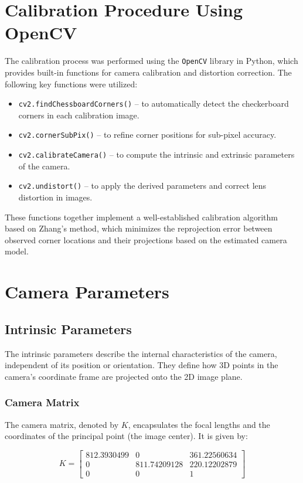 \section{Calibration Procedure Using OpenCV}
The calibration process was performed using the \texttt{OpenCV} library in Python, which provides built-in functions for camera calibration and distortion correction. The following key functions were utilized:
\begin{itemize}
    \item \texttt{cv2.findChessboardCorners()} – to automatically detect the checkerboard corners in each calibration image.
    \item \texttt{cv2.cornerSubPix()} – to refine corner positions for sub-pixel accuracy.
    \item \texttt{cv2.calibrateCamera()} – to compute the intrinsic and extrinsic parameters of the camera.
    \item \texttt{cv2.undistort()} – to apply the derived parameters and correct lens distortion in images.
\end{itemize}

These functions together implement a well-established calibration algorithm based on Zhang’s method, which minimizes the reprojection error between observed corner locations and their projections based on the estimated camera model.

\section{Camera Parameters}

\subsection{Intrinsic Parameters}
The intrinsic parameters describe the internal characteristics of the camera, independent of its position or orientation. They define how 3D points in the camera’s coordinate frame are projected onto the 2D image plane.

\subsubsection{Camera Matrix}
The camera matrix, denoted by \(K\), encapsulates the focal lengths and the coordinates of the principal point (the image center). It is given by:

\[
K =
\begin{bmatrix}
812.3930499 & 0 & 361.22560634 \\
0 & 811.74209128 & 220.12202879 \\
0 & 0 & 1
\end{bmatrix}
\]

